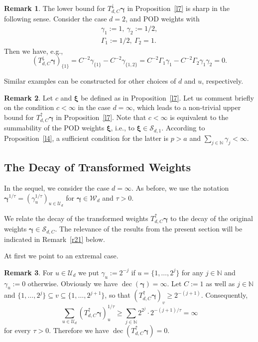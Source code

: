 \documentclass{article}
\newcommand{\N}  {{\mathbb N}}
\newcommand{\bg}{{\boldsymbol{\gamma}}}
\newcommand{\bxi}{{\boldsymbol{\xi}}}
\newcommand{\U}  {\mathcal{U}}
\newcommand{\W}  {\mathcal{W}}
\newcommand{\SSS}{\mathcal{S}}
\newcommand{\lo}{\downarrow}
\newcommand{\up}{\uparrow}
\DeclareMathOperator{\decay}{dec}
\theoremstyle{plain}
\theoremstyle{definition}
\newtheorem{rem}{Remark}
\begin{document}
\begin{rem}\label{Rem6}
The lower bound for $T^\lo_{d,C} \bg$ in Proposition~\ref{l7}
is sharp in the following 
sense. Consider the case $d=2$, and POD weights with 
\begin{gather*}
\gamma_1 := 1,\ \gamma_2 :=1/2,\\
\Gamma_1 := 1/2,\ \Gamma_2=1. 
\end{gather*}
Then we have, e.g., 
\[
\left(T^\lo_{d,C} \bg\right)_{\{1\}}
= C^{-2} \gamma_{\{1\}}- C^{-2} \gamma_{\{1,2\}}
= C^{-2}\Gamma_1 \gamma_1 - C^{-2} \Gamma_2 \gamma_1 \gamma_2 = 0. 
\]
 
Similar examples can be constructed for other choices of $d$ and $u$, 
respectively. 
\end{rem}

\begin{rem}
Let $c$ and $\bxi$ be defined as in Proposition~\ref{l7}.
Let us comment briefly on the condition $c<\infty$ in the
case $d=\infty$, which
leads to a non-trivial upper bound for $T^\up_{d,C} \bg$ in
Proposition~\ref{l7}. 
Note that $c < \infty$ is equivalent to the summability of the POD
weights $\bxi$, i.e., to $\bxi \in \SSS_{d,1}$.
According to Proposition~\ref{l4}, a sufficient condition for the
latter is $p > a$ and $\sum_{j \in \N} \gamma_j < \infty$.
\end{rem}


\subsection{The Decay of Transformed Weights}\label{Subsec:Decay}

In the sequel, we consider the case $d=\infty$.
As before, we use the notation
$\bg^{1/\tau} = (\gamma_u^{1/\tau})_{u \in \U_d}$ for 
$\bg \in \W_d$ and $\tau > 0$. 

We relate the decay of the transformed weights
$T^\up_{d,C} \bg$ to the decay of the original weights $\bg 
\in \SSS_{d,C}$. 
The relevance of the results from the present section
will be indicated 
in Remark~\ref{r21} below.

At first we point to an extremal case.

\begin{rem}\label{rem:dec_extremal_case}
For $u \in \U_d$ we put $\gamma_u := 2^{-j}$ if $u =
\{1,\dots,2^j\}$ for any $j \in \N$ and $\gamma_u := 0$
otherwise. Obviously we have $\decay(\bg) =\infty$. Let $C := 1$
as well as $j \in \N$ and 
$\{1,\dots,2^j\} \subseteq v \subseteq \{1,\dots,2^{j+1}\}$, 
so that $(T^\up_{d,C} \bg)_v \geq 2^{-(j+1)}$. Consequently, 
\[
\sum_{u \in \U_d} \left(T^\up_{d,C} \bg\right)^{1/\tau}_u
\geq \sum_{j \in \N} 2^{2^j} \cdot 2^{-(j+1)/\tau} = \infty
\]
for every $\tau>0$. Therefore we have $\decay(T^\up_{d,C} \bg) = 0$.
\end{rem}
\end{document}
